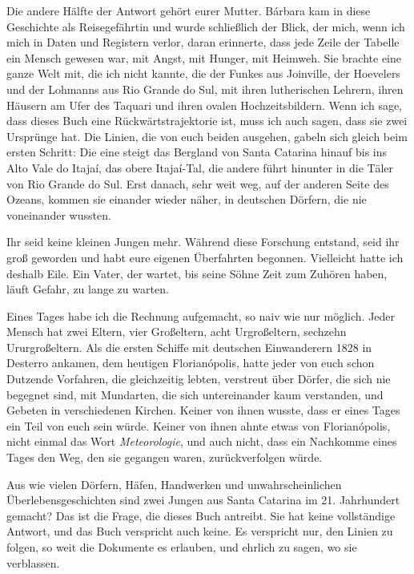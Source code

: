 \documentclass[
  ngerman,
  11pt,
  openany]{book}
\begin{document}
Die andere Hälfte der Antwort gehört eurer Mutter. Bárbara kam in diese
Geschichte als Reisegefährtin und wurde schließlich der Blick, der mich,
wenn ich mich in Daten und Registern verlor, daran erinnerte, dass jede
Zeile der Tabelle ein Mensch gewesen war, mit Angst, mit Hunger, mit
Heimweh. Sie brachte eine ganze Welt mit, die ich nicht kannte, die der
Funkes aus Joinville, der Hoevelers und der Lohmanns aus Rio Grande do
Sul, mit ihren lutherischen Lehrern, ihren Häusern am Ufer des Taquari
und ihren ovalen Hochzeitsbildern. Wenn ich sage, dass dieses Buch eine
Rückwärtstrajektorie ist, muss ich auch sagen, dass sie zwei Ursprünge
hat. Die Linien, die von euch beiden ausgehen, gabeln sich gleich beim
ersten Schritt: Die eine steigt das Bergland von Santa Catarina hinauf
bis ins Alto Vale do Itajaí, das obere Itajaí-Tal, die andere führt
hinunter in die Täler von Rio Grande do Sul. Erst danach, sehr weit weg,
auf der anderen Seite des Ozeans, kommen sie einander wieder näher, in
deutschen Dörfern, die nie voneinander wussten.

Ihr seid keine kleinen Jungen mehr. Während diese Forschung entstand,
seid ihr groß geworden und habt eure eigenen Überfahrten begonnen.
Vielleicht hatte ich deshalb Eile. Ein Vater, der wartet, bis seine
Söhne Zeit zum Zuhören haben, läuft Gefahr, zu lange zu warten.

Eines Tages habe ich die Rechnung aufgemacht, so naiv wie nur möglich.
Jeder Mensch hat zwei Eltern, vier Großeltern, acht Urgroßeltern,
sechzehn Ururgroßeltern. Als die ersten Schiffe mit deutschen
Einwanderern 1828 in Desterro ankamen, dem heutigen Florianópolis, hatte
jeder von euch schon Dutzende Vorfahren, die gleichzeitig lebten,
verstreut über Dörfer, die sich nie begegnet sind, mit Mundarten, die
sich untereinander kaum verstanden, und Gebeten in verschiedenen
Kirchen. Keiner von ihnen wusste, dass er eines Tages ein Teil von euch
sein würde. Keiner von ihnen ahnte etwas von Florianópolis, nicht einmal
das Wort \emph{Meteorologie}, und auch nicht, dass ein Nachkomme eines
Tages den Weg, den sie gegangen waren, zurückverfolgen würde.

Aus wie vielen Dörfern, Häfen, Handwerken und unwahrscheinlichen
Überlebensgeschichten sind zwei Jungen aus Santa Catarina im 21.
Jahrhundert gemacht? Das ist die Frage, die dieses Buch antreibt. Sie
hat keine vollständige Antwort, und das Buch verspricht auch keine. Es
verspricht nur, den Linien zu folgen, so weit die Dokumente es erlauben,
und ehrlich zu sagen, wo sie verblassen.
\end{document}
